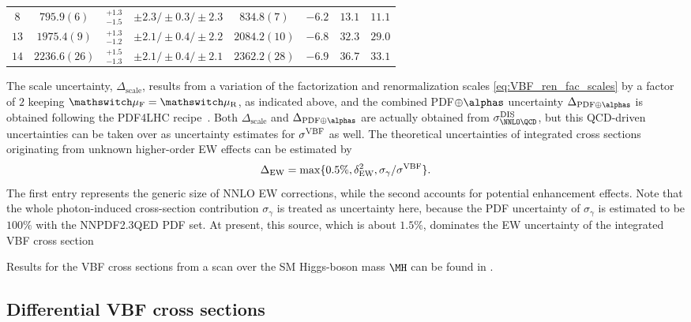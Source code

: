 \begin{table}
\begin{center}
\begin{small}
\begin{tabular}{ccccccc|c}
\\
$8$  & $795.9(6)$ &$^{+1.3}_{-1.5}$ &$\pm 2.3/\pm 0.3/\pm2.3$ & $834.8(7)$ & $-6.2$ & $13.1$ & $11.1$
\\
$13$ & $1975.4(9)$ &$^{+1.3}_{-1.2}$ &$\pm 2.1/\pm 0.4/\pm2.2$ & $2084.2(10)$ & $-6.8$ & $32.3$ & $29.0$
\\
$14$ & $2236.6(26)$ &$^{+1.5}_{-1.3}$ &$\pm 2.1/\pm 0.4/\pm2.1$ & $2362.2(28)$ & $-6.9$ & $36.7$ & $33.1$
\\
\hline
\end{tabular}%
\end{small}%
\end{center}%
\end{table}
The scale uncertainty, $\Delta_{\mathrm{scale}}$, results from a variation
of the factorization and renormalization scales
\eqref{eq:VBF_ren_fac_scales} by a factor of $2$ keeping $\muF=\muR$,
as indicated above, and the combined PDF${\oplus}\alphas$ uncertainty
$\Delta_{\mathrm{PDF\oplus\alphas}}$ is obtained following the PDF4LHC
recipe~\cite{Butterworth:2015oua}. Both $\Delta_{\mathrm{scale}}$ and
$\Delta_{\mathrm{PDF\oplus\alphas}}$ are actually obtained from
$\sigma_{\NNLO \QCD}^{\DIS}$, but this QCD-driven uncertainties can be
taken over as uncertainty estimates for $\sigma^{\mathrm{VBF}}$ as well.  The
theoretical uncertainties of integrated cross sections originating
from unknown higher-order EW effects can be estimated by
\begin{equation}
\Delta_{\mathrm{EW}} = \max\{0.5\%,\delta_{\mathrm{EW}}^2,\sigma_\gamma/\sigma^{\mathrm{VBF}}\}.
\end{equation}
The first entry represents the generic size of NNLO EW corrections, while the second accounts for
potential enhancement effects.
Note that the whole photon-induced cross-section contribution $\sigma_\gamma$ is treated
as uncertainty here, because the PDF uncertainty of $\sigma_\gamma$ is estimated to be $100\%$
with the NNPDF2.3QED PDF set. At present, this source, which is about $1.5\%$,
dominates the EW uncertainty of the integrated VBF cross section

Results for the VBF cross sections from a scan over the SM Higgs-boson mass $\MH$ 
can be found in .

\subsection{Differential VBF cross sections}

